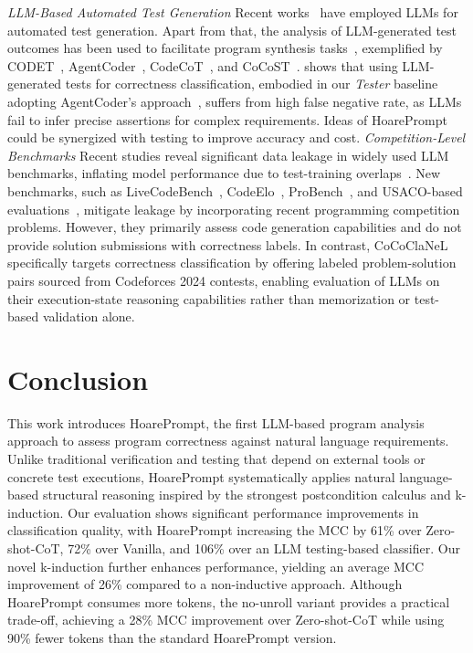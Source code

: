 \documentclass[sigconf]{acmart}
\newcommand{\projName}{HoarePrompt\xspace}
\newcommand{\benchName}{CoCoClaNeL\xspace}
\begin{document}
\textit{LLM-Based Automated Test Generation} Recent works~\cite{li2024large,schafer2023empirical,yuan2023no,chen2024chatunitest} have employed LLMs for automated test generation. Apart from that, the analysis of LLM-generated test outcomes has been used to facilitate program synthesis tasks~\cite{xiong2023program}, exemplified by CODET~\cite{chen2022codet}, AgentCoder~\cite{huang2023agentcoder}, CodeCoT~\cite{huang2023codecot}, and CoCoST~\cite{he2024cocost}.  shows that using LLM-generated tests for correctness classification, embodied in our \textit{Tester} baseline adopting AgentCoder's approach~\cite{huang2023agentcoder}, suffers from high false negative rate, as LLMs fail to infer precise assertions for complex requirements. Ideas of \projName could be synergized with testing to improve accuracy and cost. \newline
\hspace*{0.5em}\textit{Competition-Level Benchmarks} Recent studies reveal significant data leakage in widely used LLM benchmarks, inflating model performance due to test-training overlaps~\cite{training_on_bench,deng-etal-2024-unveiling}. New benchmarks, such as LiveCodeBench~\cite{jain2024livecodebenchholisticcontaminationfree}, CodeElo~\cite{quan2025codeelobenchmarkingcompetitionlevelcode}, ProBench~\cite{yang2025probenchbenchmarkinglargelanguage}, and USACO-based evaluations~\cite{shi2024language}, mitigate leakage by incorporating recent programming competition problems. However, they primarily assess code generation capabilities and do not provide solution submissions with correctness labels. In contrast, \benchName specifically targets correctness classification by offering labeled problem-solution pairs sourced from Codeforces 2024 contests, enabling evaluation of LLMs on their execution-state reasoning capabilities rather than memorization or test-based validation alone.

\vspace{-3mm}

\section{Conclusion}

This work introduces \projName, the first LLM-based program analysis approach to assess program correctness against natural language requirements. Unlike traditional verification and testing that depend on external tools or concrete test executions, \projName systematically applies natural language-based structural reasoning inspired by the strongest postcondition calculus and k-induction. Our evaluation shows significant performance improvements in classification quality, with \projName increasing the MCC by 61\% over Zero-shot-CoT, 72\% over Vanilla, and 106\% over an LLM testing-based classifier. Our novel k-induction further enhances performance, yielding an average MCC improvement of 26\% compared to a non-inductive approach. Although \projName consumes more tokens, the no-unroll variant provides a practical trade-off, achieving a 28\% MCC improvement over Zero-shot-CoT while using 90\% fewer tokens than the standard \projName version.
\end{document}
